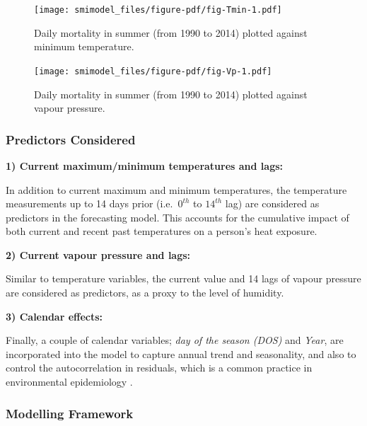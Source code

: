 \documentclass[11pt,a4paper,]{article}
\begin{document}
\begin{figure}

{\centering \texttt{[image: smimodel\_files/figure-pdf/fig-Tmin-1.pdf]}

}

\caption{\label{fig-Tmin}Daily mortality in summer (from 1990 to 2014)
plotted against minimum temperature.}

\end{figure}

\begin{figure}

{\centering \texttt{[image: smimodel\_files/figure-pdf/fig-Vp-1.pdf]}

}

\caption{\label{fig-Vp}Daily mortality in summer (from 1990 to 2014)
plotted against vapour pressure.}

\end{figure}

\hypertarget{predictors-considered}{%
\subsubsection{Predictors Considered}\label{predictors-considered}}

\textbf{1) Current maximum/minimum temperatures and lags:}

In addition to current maximum and minimum temperatures, the temperature
measurements up to 14 days prior (i.e.~\(0^{th}\) to \(14^{th}\) lag)
are considered as predictors in the forecasting model. This accounts for
the cumulative impact of both current and recent past temperatures on a
person's heat exposure.

\textbf{2) Current vapour pressure and lags:}

Similar to temperature variables, the current value and 14 lags of
vapour pressure are considered as predictors, as a proxy to the level of
humidity.

\textbf{3) Calendar effects:}

Finally, a couple of calendar variables; \emph{day of the season (DOS)}
and \emph{Year}, are incorporated into the model to capture annual trend
and seasonality, and also to control the autocorrelation in residuals,
which is a common practice in environmental epidemiology
\autocite{Masselot2022}.

\hypertarget{modelling-framework}{%
\subsubsection{Modelling Framework}\label{modelling-framework}}
\end{document}
